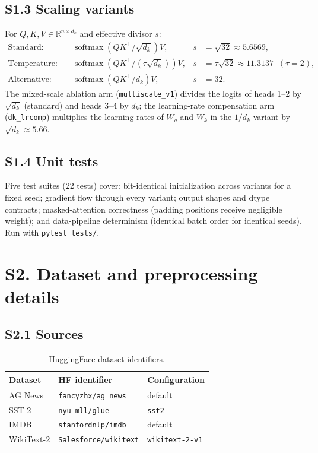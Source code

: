 \documentclass[10pt,a4paper]{article}
\newcommand{\dk}{d_k}
\begin{document}
\subsection*{S1.3 Scaling variants}
For $Q, K, V \in \mathbb{R}^{n \times \dk}$ and effective divisor $s$:
\begin{align*}
  \text{Standard:}\quad & \operatorname{softmax}\!\left(QK^{\top}/\sqrt{\dk}\right)V,
  & s &= \sqrt{32} \approx 5.6569, \\
  \text{Temperature:}\quad & \operatorname{softmax}\!\left(QK^{\top}/(\tau\sqrt{\dk})\right)V,
  & s &= \tau\sqrt{32} \approx 11.3137 \;\; (\tau = 2), \\
  \text{Alternative:}\quad & \operatorname{softmax}\!\left(QK^{\top}/\dk\right)V,
  & s &= 32.
\end{align*}
The mixed-scale ablation arm (\texttt{multiscale\_v1}) divides the logits of
heads 1--2 by $\sqrt{\dk}$ (standard) and heads 3--4 by $\dk$; the
learning-rate compensation arm (\texttt{dk\_lrcomp}) multiplies the learning
rates of $W_q$ and $W_k$ in the $1/\dk$ variant by $\sqrt{\dk} \approx 5.66$.

\subsection*{S1.4 Unit tests}
Five test suites (22 tests) cover: bit-identical initialization across variants
for a fixed seed; gradient flow through every variant; output shapes and
dtype contracts; masked-attention correctness (padding positions receive
negligible weight); and data-pipeline determinism (identical batch order for
identical seeds). Run with \texttt{pytest tests/}.

\section*{S2. Dataset and preprocessing details}\label{sup:data}

\subsection*{S2.1 Sources}
\begin{table}[H]
  \centering
  \caption{HuggingFace dataset identifiers.}
  \small
  \begin{tabular}{l l l}
    \toprule
    \textbf{Dataset} & \textbf{HF identifier} & \textbf{Configuration} \\
    \midrule
    AG News    & \texttt{fancyzhx/ag\_news} & default \\
    SST-2      & \texttt{nyu-mll/glue} & \texttt{sst2} \\
    IMDB       & \texttt{stanfordnlp/imdb} & default \\
    WikiText-2 & \texttt{Salesforce/wikitext} & \texttt{wikitext-2-v1} \\
    \bottomrule
  \end{tabular}
\end{table}
\end{document}
